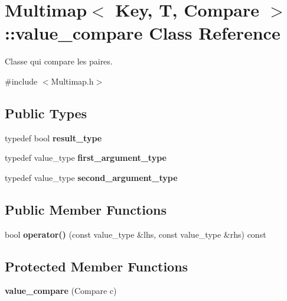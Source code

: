 \hypertarget{classMultimap_1_1value__compare}{}\section{Multimap$<$ Key, T, Compare $>$\+:\+:value\+\_\+compare Class Reference}
\label{classMultimap_1_1value__compare}


Classe qui compare les paires.  




{\ttfamily \#include $<$Multimap.\+h$>$}

\subsection*{Public Types}
\begin{DoxyCompactItemize}
\item 
\mbox{\label{classMultimap_1_1value__compare_a8a34051443c474d05e7864feed1b6d81}} 
typedef bool {\bfseries result\+\_\+type}
\item 
\mbox{\label{classMultimap_1_1value__compare_a194d5ffd210c7ab77b3119cedb22c51a}} 
typedef value\+\_\+type {\bfseries first\+\_\+argument\+\_\+type}
\item 
\mbox{\label{classMultimap_1_1value__compare_af2ba2cc0bed81b3772371bfb13350dbe}} 
typedef value\+\_\+type {\bfseries second\+\_\+argument\+\_\+type}
\end{DoxyCompactItemize}
\subsection*{Public Member Functions}
\begin{DoxyCompactItemize}
\item 
\mbox{\label{classMultimap_1_1value__compare_a86e3025154d686741ad33e78f80d1c13}} 
bool {\bfseries operator()} (const value\+\_\+type \&lhs, const value\+\_\+type \&rhs) const
\end{DoxyCompactItemize}
\subsection*{Protected Member Functions}
\begin{DoxyCompactItemize}
\item 
\mbox{\label{classMultimap_1_1value__compare_a48661dffd6e198a2dd96ff172f0d5d44}} 
{\bfseries value\+\_\+compare} (Compare c)
\end{DoxyCompactItemize}
